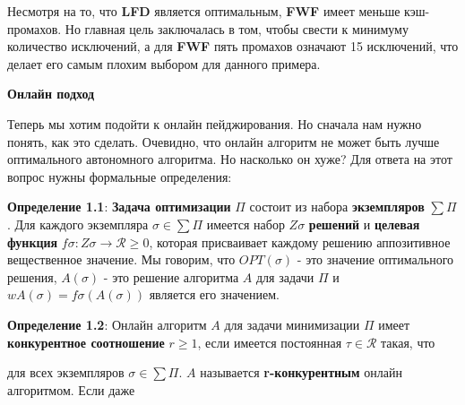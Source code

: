 Несмотря на то, что \textbf{LFD} является оптимальным, \textbf{FWF} имеет меньше кэш-промахов. Но главная цель заключалась в том, чтобы свести к минимуму количество исключений, а для \textbf{FWF} пять промахов означают 15 исключений, что делает его самым плохим выбором для данного примера.

\vspace{\baselineskip}

\textbf{Онлайн подход}

\vspace{\baselineskip}

Теперь мы хотим подойти к онлайн пейджирования. Но сначала нам нужно понять, как это сделать. Очевидно, что онлайн алгоритм не может быть лучше оптимального автономного алгоритма. Но насколько он хуже? Для ответа на этот вопрос нужны формальные определения:

\vspace{\baselineskip}

\textbf{Определение 1.1}: \textbf{Задача оптимизации} $\Pi$ состоит из набора \textbf{экземпляров} $\sum \Pi$. Для каждого экземпляра $\sigma \in \sum \Pi$ имеется набор $Z\sigma$ \textbf{решений} и \textbf{целевая функция} $f\sigma:Z\sigma\rightarrow\mathcal{R}\geq0$, которая присваивает каждому решению аппозитивное вещественное значение. Мы говорим, что $OPT(\sigma)$ - это значение оптимального решения, $A(\sigma)$ - это решение алгоритма $A$ для задачи $\Pi$ и $wA(\sigma)=f\sigma(A(\sigma))$ является его значением.

\vspace{\baselineskip}

\textbf{Определение 1.2}: Онлайн алгоритм $A$ для задачи минимизации $\Pi$ имеет \textbf{конкурентное соотношение} $r \geq 1$, если имеется постоянная $\tau\in\mathcal{R}$ такая, что

\vspace{\baselineskip}


\vspace{\baselineskip}

для всех экземпляров $\sigma\in\sum\Pi$. $A$ называется \textbf{r-конкурентным} онлайн алгоритмом. Если даже

\vspace{\baselineskip}


\vspace{\baselineskip}

